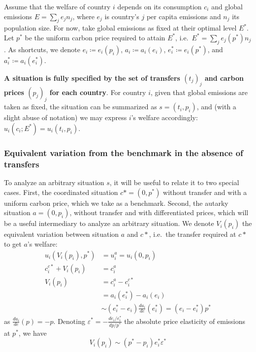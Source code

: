 \documentclass[12pt,english]{article}
\begin{document}
Assume that the welfare of country $i$  depends on its consumption $c_i$ and global emissions $E=\sum_j e_j n_j$, where $e_j$ is country's $j$ per capita emissions and $n_j$ its population size.
For now, take global emissions as fixed at their optimal level $E^*$. Let $p^*$ be the uniform carbon price required to attain $E^*$, i.e.~$E^*=\sum_j e_j(p^*) n_j$. As shortcuts, we denote $e_i \coloneqq e_i(p_i)$, $a_i \coloneqq a_i(e_i)$, $e^*_i \coloneqq e_i(p^*) $, and $a^*_i \coloneqq a_i(e^*_i)$.

\textbf{A situation is fully specified by the set of transfers $(t_j)_j$ and carbon prices $(p_j)_j$ for each country}. For country $i$, given that global emissions are taken as fixed, the situation can be summarized as $s=(t_i, p_i)$, and (with a slight abuse of notation) we may express $i$'s welfare accordingly:
$u_i(c_i;E^*)=u_i(t_i,p_i)$.

\subsubsection*{Equivalent variation from the benchmark in the absence of
transfers}\label{equivalent-variation-from-the-benchmark-in-the-absence-of-transfers}

To analyze an arbitrary situation $s$, it will be useful to relate it to two special cases. First, the coordinated situation $c*=(0,p^*)$ without transfer and with a uniform carbon price, which we take as a benchmark. Second, the autarky situation $a=(0, p_i)$, without transfer and with differentiated prices, which will be a useful intermediary to analyze an arbitrary situation. We denote $V_i(p_i)$ the equivalent variation between situation $a$ and $c*$, i.e.~the transfer required at $c*$ to get $a$'s welfare: 
$$\begin{aligned}
u_i(V_i(p_i), p^*)&=u^a_i=u_i(0, p_i) \\
c^{c*}_i + V_i(p_i) &= c^a_i \\
V_i(p_i) &= c^a_i - c^{c*}_i \\
&= a_i(e^*_i ) - a_i(e_i) \\
 &\sim  (e^*_i  - e_i) \frac{da_i}{de} (e^*_i ) = (e_i - e^*_i ) p^* 
\end{aligned}$$
as $\frac{da_i}{de} (p) = -p$.
Denoting $\varepsilon^* = -\frac{de_i/e^*_i }{dp/p^*}$ the absolute price elasticity of emissions at $p^*$, we have $$V_i(p_i) \sim (p^* - p_i) e^*_i  \varepsilon^* $$
\end{document}
